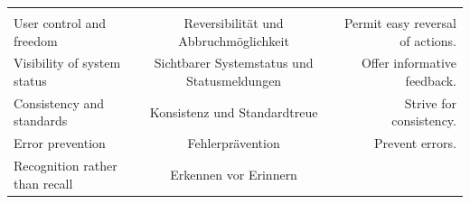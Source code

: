 \documentclass[
  12pt,
  ngerman,
  a4paper,
]{article}
\begin{document}
\begin{longtable}[]{@{}lcr@{}}
\begin{minipage}[t]{0.30\columnwidth}
\strut
\end{minipage}\tabularnewline
\begin{minipage}[t]{0.30\columnwidth}\raggedright
User control and freedom\strut
\end{minipage} & \begin{minipage}[t]{0.31\columnwidth}\centering
Reversibilität und Abbruchmöglichkeit\strut
\end{minipage} & \begin{minipage}[t]{0.30\columnwidth}\raggedleft
Permit easy reversal of actions.\strut
\end{minipage}\tabularnewline
\begin{minipage}[t]{0.30\columnwidth}\raggedright
Visibility of system status\strut
\end{minipage} & \begin{minipage}[t]{0.31\columnwidth}\centering
Sichtbarer Systemstatus und Statusmeldungen\strut
\end{minipage} & \begin{minipage}[t]{0.30\columnwidth}\raggedleft
Offer informative feedback.\strut
\end{minipage}\tabularnewline
\begin{minipage}[t]{0.30\columnwidth}\raggedright
Consistency and standards\strut
\end{minipage} & \begin{minipage}[t]{0.31\columnwidth}\centering
Konsistenz und Standardtreue\strut
\end{minipage} & \begin{minipage}[t]{0.30\columnwidth}\raggedleft
Strive for consistency.\strut
\end{minipage}\tabularnewline
\begin{minipage}[t]{0.30\columnwidth}\raggedright
Error prevention\strut
\end{minipage} & \begin{minipage}[t]{0.31\columnwidth}\centering
Fehlerprävention\strut
\end{minipage} & \begin{minipage}[t]{0.30\columnwidth}\raggedleft
Prevent errors.\strut
\end{minipage}\tabularnewline
\begin{minipage}[t]{0.30\columnwidth}\raggedright
Recognition rather than recall\strut
\end{minipage} & \begin{minipage}[t]{0.31\columnwidth}\centering
Erkennen vor Erinnern\strut
\end{minipage} & \begin{minipage}[t]{0.30\columnwidth}\raggedleft

\end{minipage}
\end{longtable}
\end{document}
